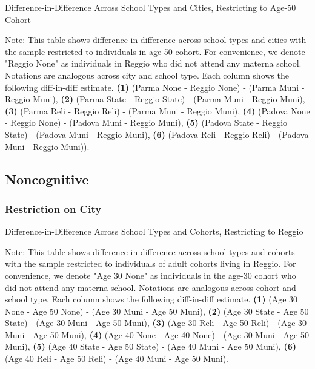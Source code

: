 \documentclass[11pt]{article}
\begin{document}
\begin{table}[H]
\begin{center}
	\caption{Difference-in-Difference Across School Types and Cities, Restricting to Age-50 Cohort} \label{table:HCh-50}
	\scalebox{0.80}{
		}
\end{center}
\footnotesize
\underline{Note:} This table shows difference in difference across school types and cities with the sample restricted to individuals in age-50 cohort. For convenience, we denote "Reggio None" as individuals in Reggio who did not attend any materna school. Notations are analogous across city and school type. Each column shows the following diff-in-diff estimate. \textbf{(1)} (Parma None - Reggio None) - (Parma Muni - Reggio Muni), \textbf{(2)} (Parma State - Reggio State) - (Parma Muni - Reggio Muni), \textbf{(3)} (Parma Reli - Reggio Reli) - (Parma Muni - Reggio Muni), \textbf{(4)} (Padova None - Reggio None) - (Padova Muni - Reggio Muni),  \textbf{(5)} (Padova State - Reggio State) - (Padova Muni - Reggio Muni), \textbf{(6)} (Padova Reli - Reggio Reli) - (Padova Muni - Reggio Muni)). 
\end{table}



\subsection{Noncognitive}
\subsubsection{Restriction on City}
\begin{table}[H]
\begin{center}
	\caption{Difference-in-Difference Across School Types and Cohorts, Restricting to Reggio} \label{table:NC-Reggio}
	\scalebox{0.80}{
		}
\end{center}
\footnotesize
\underline{Note:} This table shows difference in difference across school types and cohorts with the sample restricted to individuals of adult cohorts living in Reggio. For convenience, we denote "Age 30 None" as individuals in the age-30 cohort who did not attend any materna school. Notations are analogous across cohort and school type. Each column shows the following diff-in-diff estimate. \textbf{(1)} (Age 30 None - Age 50 None) - (Age 30 Muni - Age 50 Muni), \textbf{(2)} (Age 30 State - Age 50 State) - (Age 30 Muni - Age 50 Muni), \textbf{(3)} (Age 30 Reli - Age 50 Reli) - (Age 30 Muni - Age 50 Muni), \textbf{(4)} (Age 40 None - Age 40 None) - (Age 30 Muni - Age 50 Muni),  \textbf{(5)} (Age 40 State - Age 50 State) - (Age 40 Muni - Age 50 Muni), \textbf{(6)} (Age 40 Reli - Age 50 Reli) - (Age 40 Muni - Age 50 Muni). 
\end{table}
\end{document}
